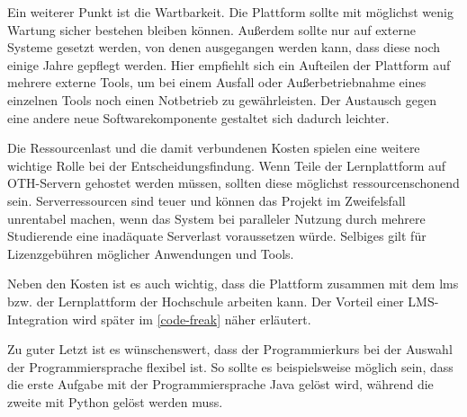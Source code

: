 Ein weiterer Punkt ist die Wartbarkeit. Die Plattform sollte mit möglichst wenig
Wartung sicher bestehen bleiben können. Außerdem sollte nur auf externe Systeme
gesetzt werden, von denen ausgegangen werden kann, dass diese noch einige Jahre
gepflegt werden. Hier empfiehlt sich ein Aufteilen der Plattform auf mehrere
externe Tools, um bei einem Ausfall oder Außerbetriebnahme eines einzelnen Tools
noch einen Notbetrieb zu gewährleisten. Der Austausch gegen eine andere neue 
Softwarekomponente gestaltet sich dadurch leichter.

Die Ressourcenlast und die damit verbundenen Kosten spielen eine weitere
wichtige Rolle bei der Entscheidungsfindung. Wenn Teile der Lernplattform auf
OTH-Servern gehostet werden müssen, sollten diese möglichst ressourcenschonend
sein. Serverressourcen sind teuer und können das Projekt im Zweifelsfall
unrentabel machen, wenn das System bei paralleler Nutzung durch mehrere
Studierende eine inadäquate Serverlast voraussetzen würde. Selbiges gilt für
Lizenzgebühren möglicher Anwendungen und Tools.

Neben den Kosten ist es auch wichtig, dass die Plattform zusammen mit dem
\ac{lms} bzw. der Lernplattform der Hochschule arbeiten kann. Der Vorteil einer
LMS-Integration wird später im \autoref{code-freak} näher erläutert.

Zu guter Letzt ist es wünschenswert, dass der Programmierkurs bei der Auswahl
der Programmiersprache flexibel ist. So sollte es beispielsweise möglich sein,
dass die erste Aufgabe mit der Programmiersprache Java gelöst wird,
während die zweite mit Python gelöst werden muss.